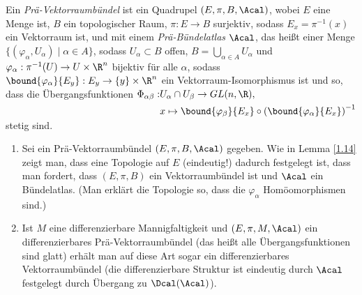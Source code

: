 \begin{defn}  
	Ein \emph{Prä-Vektorraumbündel} ist ein Quadrupel $ (E,\pi,B,\Acal) $, wobei $E$ eine Menge ist, $B$ ein topologischer Raum, $\pi: E \to B$ surjektiv, sodass $E_x = \pi^{-1}(x)$ ein Vektorraum ist, und mit einem \emph{Prä-Bündelatlas} $\Acal$, das heißt einer Menge $ \{(\varphi_\alpha,U_\alpha) \mid \alpha \in A\} $, sodass $U_\alpha \subset B$ offen, $ B = \bigcup_{\alpha \in A} U_\alpha $ und $ \varphi_\alpha: \pi^{-1}(U) \to U \times \R^n $ bijektiv für alle $\alpha$, sodass $ \bound{\varphi_\alpha}{E_y}: E_y \to \{y\} \times \R^n $ ein Vektorraum-Isomorphismus ist und so, dass die Übergangsfunktionen 
	$ \begin{aligned}[t]
		\Phi_{\alpha \beta}: &U_\alpha \cap U_\beta \to GL(n,\R),\\
		 &x \mapsto \bound{\varphi_\beta}{E_x} \circ \left( \bound{\varphi_\alpha}{E_x} \right)^{-1}
	\end{aligned} $ stetig sind.
\end{defn}

\begin{rem}
	\begin{enumerate}[label= {\roman*})]
		\item Sei ein Prä-Vektorraumbündel $ (E,\pi,B,\Acal) $ gegeben. Wie in Lemma \ref{1.14} zeigt man, dass eine Topologie auf $E$ (eindeutig!) dadurch festgelegt ist, dass man fordert, dass $(E,\pi,B)$ ein Vektorraumbündel ist und $\Acal$ ein Bündelatlas. (Man erklärt die Topologie so, dass die $\varphi_\alpha$ Homöomorphismen sind.)
		\item Ist $M$ eine differenzierbare Mannigfaltigkeit und $ (E,\pi,M,\Acal) $ ein differenzierbares Prä-Vektorraumbündel (das heißt alle Übergangsfunktionen sind glatt) erhält man auf diese Art sogar ein differenzierbares Vektorraumbündel (die differenzierbare Struktur ist eindeutig durch $\Acal$ festgelegt durch Übergang zu $\Dcal(\Acal)$).
	\end{enumerate}
\end{rem}

